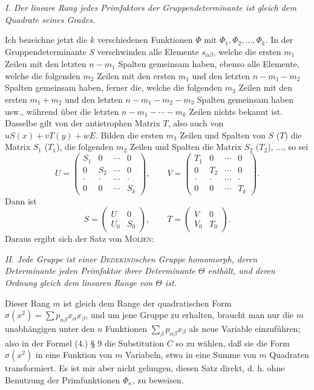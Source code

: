 \documentclass[11pt]{article}
\begin{document}
\emph{I. Der lineare Rang jedes Primfaktors der Gruppendeterminante ist gleich dem Quadrate seines Grades.}

Ich bezeichne jetzt die $k$ verschiedenen Funktionen $\Phi$ mit $\Phi_1,\Phi_2,\ldots,\Phi_k$. In der Gruppendeterminante $S$ verschwinden alle Elemente $s_{\alpha\beta}$, welche die ersten $m_1$ Zeilen mit den letzten $n-m_1$ Spalten gemeinsam haben, ebenso alle Elemente, welche die folgenden $m_2$ Zeilen mit den ersten $m_1$ und den letzten $n-m_1-m_2$ Spalten gemeinsam haben, ferner die, welche die folgenden $m_3$ Zeilen mit den ersten $m_1+m_2$ und den letzten $n-m_1-m_2-m_3$ Spalten gemeinsam haben usw., während über die letzten $n-m_1-\cdots-m_k$ Zeilen nichts bekannt ist. Dasselbe gilt von der antistrophen Matrix $T$, also auch von $uS(x)+vT(y)+wE$. Bilden die ersten $m_1$ Zeilen und Spalten von $S$ ($T$) die Matrix $S_1$ ($T_1$), die folgenden $m_2$ Zeilen und Spalten die Matrix $S_2$ ($T_2$), $\ldots$, so sei
\[
 U=\begin{pmatrix}
 S_1&0&\cdots&0\\
 0&S_2&\cdots&0\\
 \cdot&\cdot&\cdots&\cdot\\
 0&0&\cdots&S_k
 \end{pmatrix},
 \qquad
 V=\begin{pmatrix}
 T_1&0&\cdots&0\\
 0&T_2&\cdots&0\\
 \cdot&\cdot&\cdots&\cdot\\
 0&0&\cdots&T_k
 \end{pmatrix}.
\]
Dann ist
\[
 S=\begin{pmatrix}U&0\\ U_0&S_0\end{pmatrix},
 \qquad
 T=\begin{pmatrix}V&0\\ V_0&T_0\end{pmatrix}.
\]
Daraus ergibt sich der Satz von \textsc{Molien}:

\emph{II. Jede Gruppe ist einer \textsc{Dedekind}schen Gruppe homomorph, deren Determinante jeden Primfaktor ihrer Determinante $\Theta$ enthält, und deren Ordnung gleich dem linearen Range von $\Theta$ ist.}

Dieser Rang $m$ ist gleich dem Range der quadratischen Form $\sigma(x^2)=\sum p_{\alpha\beta}x_\alpha x_\beta$, und um jene Gruppe zu erhalten, braucht man nur die $m$ unabhängigen unter den $n$ Funktionen $\sum_\beta p_{\alpha\beta}x_\beta$ als neue Variable einzuführen; also in der Formel (4.) § 9 die Substitution $C$ so zu wählen, daß sie die Form $\sigma(x^2)$ in eine Funktion von $m$ Variabeln, etwa in eine Summe von $m$ Quadraten transformiert. Es ist mir aber nicht gelungen, diesen Satz direkt, d. h. ohne Benutzung der Primfunktionen $\Phi_\kappa$, zu beweisen.
\end{document}
